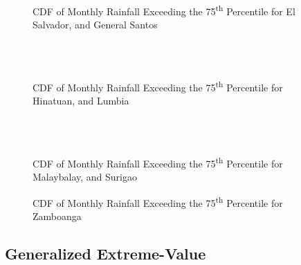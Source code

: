 \begin{figure}[H]
  \centering   
  \\
  \caption{CDF of Monthly Rainfall Exceeding the 75\textsuperscript{th} Percentile for El Salvador, and General Santos}
  \label{fig:monthly_0.75_appendix_gpd_pt3}
\end{figure}

\begin{figure}[H]
  \centering
  \\
  \\
\caption{CDF of Monthly Rainfall Exceeding the 75\textsuperscript{th} Percentile for Hinatuan, and Lumbia}
  \label{fig:monthly_0.75_appendix_gpd_pt4}
\end{figure}


\begin{figure}[H]
  \centering  
  \\
  \\
\caption{CDF of Monthly Rainfall Exceeding the 75\textsuperscript{th} Percentile for Malaybalay, and Surigao}
  \label{fig:monthly_0.75_appendix_gpd_pt5}
\end{figure}

\begin{figure}[H]
  \centering
  \caption{CDF of Monthly Rainfall Exceeding the 75\textsuperscript{th} Percentile for Zamboanga}
  \label{fig:monthly_0.75_appendix_gpd_pt6}
\end{figure}


\subsection{Generalized Extreme-Value}

